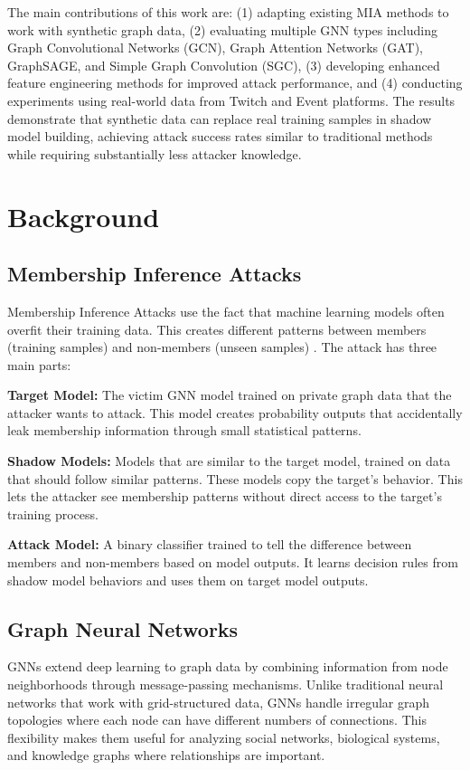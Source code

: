 \documentclass{article}
\begin{document}
The main contributions of this work are: (1) adapting existing MIA methods to work with synthetic graph data, (2) evaluating multiple GNN types including Graph Convolutional Networks (GCN), Graph Attention Networks (GAT), GraphSAGE, and Simple Graph Convolution (SGC), (3) developing enhanced feature engineering methods for improved attack performance, and (4) conducting experiments using real-world data from Twitch and Event platforms. The results demonstrate that synthetic data can replace real training samples in shadow model building, achieving attack success rates similar to traditional methods while requiring substantially less attacker knowledge.

\section{Background}
\subsection{Membership Inference Attacks}
Membership Inference Attacks use the fact that machine learning models often overfit their training data. This creates different patterns between members (training samples) and non-members (unseen samples) \cite{salem2019ml, nasr2019comprehensive}. The attack has three main parts:

\textbf{Target Model:} The victim GNN model trained on private graph data that the attacker wants to attack. This model creates probability outputs that accidentally leak membership information through small statistical patterns.

\textbf{Shadow Models:} Models that are similar to the target model, trained on data that should follow similar patterns. These models copy the target's behavior. This lets the attacker see membership patterns without direct access to the target's training process.

\textbf{Attack Model:} A binary classifier trained to tell the difference between members and non-members based on model outputs. It learns decision rules from shadow model behaviors and uses them on target model outputs.

\subsection{Graph Neural Networks}
GNNs extend deep learning to graph data by combining information from node neighborhoods through message-passing mechanisms. Unlike traditional neural networks that work with grid-structured data, GNNs handle irregular graph topologies where each node can have different numbers of connections. This flexibility makes them useful for analyzing social networks, biological systems, and knowledge graphs where relationships are important.
\end{document}
